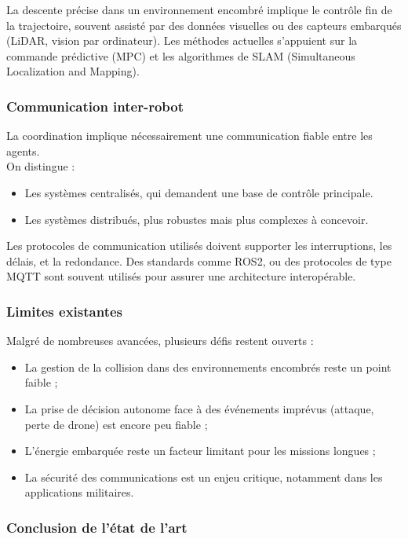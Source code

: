 \documentclass[a4paper,12pt]{article}
\begin{document}
La descente précise dans un environnement encombré implique le contrôle fin de la trajectoire, souvent assisté par des données visuelles ou des capteurs embarqués (LiDAR, vision par ordinateur). Les méthodes actuelles s’appuient sur la commande prédictive (MPC) et les algorithmes de SLAM (Simultaneous Localization and Mapping).

\subsubsection*{Communication inter-robot}

La coordination implique nécessairement une communication fiable entre les agents. \\
On distingue :
\begin{itemize}
    \item Les systèmes centralisés, qui demandent une base de contrôle principale.
    \item Les systèmes distribués, plus robustes mais plus complexes à concevoir.
\end{itemize}

Les protocoles de communication utilisés doivent supporter les interruptions, les délais, et la redondance. Des standards comme ROS2, ou des protocoles de type MQTT sont souvent utilisés pour assurer une architecture interopérable.

\subsubsection*{Limites existantes}

Malgré de nombreuses avancées, plusieurs défis restent ouverts :

\begin{itemize}
    \item La gestion de la collision dans des environnements encombrés reste un point faible ;
    \item La prise de décision autonome face à des événements imprévus (attaque, perte de drone) est encore peu fiable ;
    \item L’énergie embarquée reste un facteur limitant pour les missions longues ;
    \item La sécurité des communications est un enjeu critique, notamment dans les applications militaires.
\end{itemize}

\subsubsection*{Conclusion de l'état de l'art}
\end{document}
